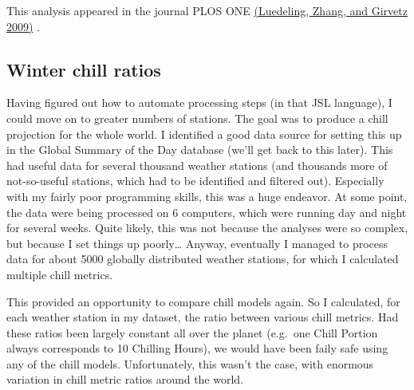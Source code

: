 \documentclass[
]{book}
\begin{document}
This analysis appeared in the journal PLOS ONE \href{https://journals.plos.org/plosone/article?id=10.1371/journal.pone.0006166}{(Luedeling, Zhang, and Girvetz \protect\hyperlink{ref-luedeling_climatic_2009}{2009})} .

\hypertarget{winter-chill-ratios}{%
\subsection{Winter chill ratios}\label{winter-chill-ratios}}

Having figured out how to automate processing steps (in that JSL language), I could move on to greater numbers of stations. The goal was to produce a chill projection for the whole world. I identified a good data source for setting this up in the Global Summary of the Day database (we'll get back to this later). This had useful data for several thousand weather stations (and thousands more of not-so-useful stations, which had to be identified and filtered out). Especially with my fairly poor programming skills, this was a huge endeavor. At some point, the data were being processed on 6 computers, which were running day and night for several weeks. Quite likely, this was not because the analyses were so complex, but because I set things up poorly\ldots{} Anyway, eventually I managed to process data for about 5000 globally distributed weather stations, for which I calculated multiple chill metrics.

This provided an opportunity to compare chill models again. So I calculated, for each weather station in my dataset, the ratio between various chill metrics. Had these ratios been largely constant all over the planet (e.g.~one Chill Portion always corresponds to 10 Chilling Hours), we would have been faily safe using any of the chill models. Unfortunately, this wasn't the case, with enormous variation in chill metric ratios around the world.
\end{document}
